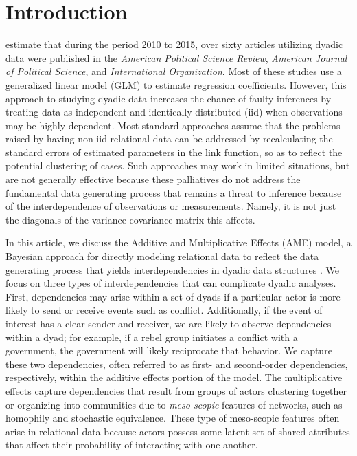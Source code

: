\section{\textbf{Introduction}}

\citet{aronow:etal:2015} estimate that during the period 2010 to 2015, over sixty articles utilizing dyadic data were published in the \textit{American Political Science Review}, \textit{American Journal of Political Science}, and \textit{International Organization}. Most of these studies use a generalized linear model (GLM) to estimate regression coefficients.  However, this approach to studying dyadic data increases the chance of faulty inferences by treating data as independent and identically distributed (iid) when observations may be highly dependent. Most standard approaches assume that the problems raised by having non-iid relational data can be addressed by recalculating the standard errors of estimated parameters in the link function, so as to reflect the potential clustering of cases. Such approaches may work in limited situations, but are not generally effective because these palliatives do not address the fundamental data generating process that remains a threat to inference because of the interdependence of observations or measurements. Namely, it is not just the diagonals of the variance-covariance matrix this affects. %

In this article, we discuss the Additive and Multiplicative Effects (AME) model, 
a Bayesian approach for directly modeling relational data to reflect the data generating process that yields interdependencies in dyadic data structures \citep{hoff:2008,minhas:etal:2016:arxiv}. We focus on three types of interdependencies that can complicate dyadic analyses. First, dependencies may arise within a set of dyads if a particular actor is more likely to send or receive events such as conflict. Additionally, if the event of interest has a clear sender and receiver, we are likely to observe dependencies within a dyad; for example, if a rebel group initiates a conflict with a government, the government will likely reciprocate that behavior. We capture these two dependencies, often referred to as first- and second-order dependencies, respectively, within the additive effects portion of the model. The multiplicative effects capture dependencies that result from groups of actors clustering together or organizing into communities due to \textit{meso-scopic} features of networks, such as homophily and stochastic equivalence. These type of meso-scopic features often arise in relational data because actors possess some latent set of shared attributes that affect their probability of interacting with one another. 

